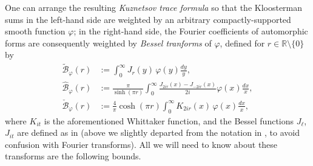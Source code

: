 \documentclass[reqno,11pt]{amsart}
\theoremstyle{remark}
\numberwithin{equation}{section}
\newcommand{\R}{\mathbb{R}}
\newcommand{\mB}{\mathcal{B}}
\renewcommand{\hat}{\widehat}
\renewcommand{\tilde}{\widetilde}
\begin{document}
One can arrange the resulting \emph{Kuznetsov trace formula} so that the Kloosterman sums in the left-hand side are weighted by an arbitrary compactly-supported smooth function $\varphi$; in the right-hand side, the Fourier coefficients of automorphic forms are consequently weighted by \emph{Bessel tranforms} of $\varphi$, defined for $r \in \R \setminus \{0\}$ by
\begin{equation} \label{eq:Bessel-transform}
\begin{aligned}
    \tilde{\mB}_\varphi(r) &:= \int_0^\infty J_r(y)\, \varphi(y) \frac{dy}{y},
    \\
    \hat{\mB}_\varphi(r) &:= \frac{\pi}{\sinh(\pi r)} \int_0^\infty \frac{J_{2ir}(x) - J_{-2ir}(x)}{2i} \varphi(x) \frac{dx}{x},
    \\
    \check{\mB}_\varphi(r) &:= \frac{4}{\pi} \cosh(\pi r) \int_0^\infty K_{2ir}(x)\, \varphi(x) \frac{dx}{x},
\end{aligned}
\end{equation}
where $K_{it}$ is the aforementioned Whittaker function, and the Bessel functions $J_\ell$, $J_{it}$ are defined as in \cite[p.\,264--265]{deshouillers1982kloosterman}
(above we slightly departed from the notation in \cite{deshouillers1982kloosterman,drappeau2017sums}, to avoid confusion with Fourier transforms). All we will need to know about these transforms are the following bounds.
\end{document}
